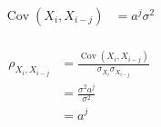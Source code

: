 \begin{itemize}
    \begin{align*}
        \operatorname{Cov}(X_i, X_{i-j}) &= a^j \sigma^2 \\
    \end{align*}

    \begin{align*}
        \rho_{X_i,X_{i-j}} &= \frac{\operatorname{Cov}(X_i,X_{i-j})}{\sigma_{X_i} \sigma_{X_{i-j}}} \\
        &= \frac{\sigma^2 a^{j}}{\sigma^2} \\
        &= a^{j} \\
    \end{align*}

\end{itemize}